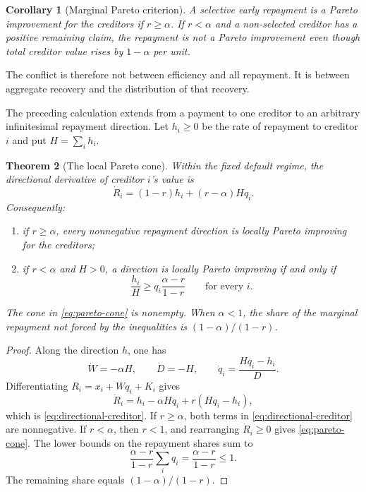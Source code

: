 \documentclass[11pt]{article}
\newtheorem{theorem}{Theorem}[section]
\newtheorem{corollary}[theorem]{Corollary}
\theoremstyle{definition}
\theoremstyle{remark}
\begin{document}
\begin{corollary}[Marginal Pareto criterion]
A selective early repayment is a Pareto improvement for the creditors if
$r\geq\alpha$.  If $r<\alpha$ and a non-selected creditor has a positive
remaining claim, the repayment is not a Pareto improvement even though total
creditor value rises by $1-\alpha$ per unit.
\end{corollary}

The conflict is therefore not between efficiency and all repayment.  It is
between aggregate recovery and the distribution of that recovery.

The preceding calculation extends from a payment to one creditor to an
arbitrary infinitesimal repayment direction.  Let $h_i\geq0$ be the rate of
repayment to creditor $i$ and put $H=\sum_i h_i$.

\begin{theorem}[The local Pareto cone]\label{thm:pareto-cone}
Within the fixed default regime, the directional derivative of creditor $i$'s
value is
\begin{equation}\label{eq:directional-creditor}
  \dot R_i=(1-r)h_i+(r-\alpha)Hq_i.
\end{equation}
Consequently:
\begin{enumerate}[label=(\roman*)]
  \item if $r\geq\alpha$, every nonnegative repayment direction is locally
  Pareto improving for the creditors;
  \item if $r<\alpha$ and $H>0$, a direction is locally Pareto improving if
  and only if
  \begin{equation}\label{eq:pareto-cone}
    \frac{h_i}{H}
    \geq q_i\frac{\alpha-r}{1-r}
    \qquad\text{for every }i.
  \end{equation}
\end{enumerate}
The cone in \eqref{eq:pareto-cone} is nonempty.  When $\alpha<1$, the share of
the marginal repayment not forced by the inequalities is
$(1-\alpha)/(1-r)$.
\end{theorem}

\begin{proof}
Along the direction $h$, one has
\begin{equation}
  \dot W=-\alpha H,
  \qquad
  \dot D=-H,
  \qquad
  \dot q_i=\frac{Hq_i-h_i}{D}.
\end{equation}
Differentiating $R_i=x_i+Wq_i+K_i$ gives
\begin{equation*}
  \dot R_i
  =h_i-\alpha Hq_i+r(Hq_i-h_i),
\end{equation*}
which is \eqref{eq:directional-creditor}.  If $r\geq\alpha$, both terms in
\eqref{eq:directional-creditor} are nonnegative.  If $r<\alpha$, then $r<1$,
and rearranging $\dot R_i\geq0$ gives \eqref{eq:pareto-cone}.  The lower bounds
on the repayment shares sum to
\begin{equation}
  \frac{\alpha-r}{1-r}\sum_iq_i
  =\frac{\alpha-r}{1-r}\leq1.
\end{equation}
The remaining share equals $(1-\alpha)/(1-r)$.
\end{proof}
\end{document}
